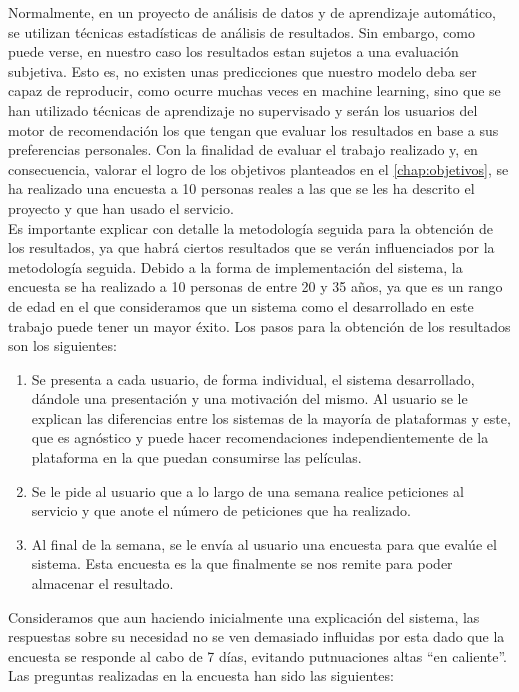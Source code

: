 Normalmente, en un proyecto de análisis de datos y de aprendizaje automático, se utilizan técnicas estadísticas de análisis de resultados. Sin embargo, como puede verse, en nuestro caso los resultados estan sujetos a una evaluación subjetiva. Esto es, no existen unas predicciones que nuestro modelo deba ser capaz de reproducir, como ocurre muchas veces en machine learning, sino que se han utilizado técnicas de aprendizaje no supervisado y serán los usuarios del motor de recomendación los que tengan que evaluar los resultados en base a sus preferencias personales. Con la finalidad de evaluar el trabajo realizado y, en consecuencia, valorar el logro de los objetivos planteados en el \autoref{chap:objetivos}, se ha realizado una encuesta a 10 personas reales a las que se les ha descrito el proyecto y que han usado el servicio.\\

Es importante explicar con detalle la metodología seguida para la obtención de los resultados, ya que habrá ciertos resultados que se verán influenciados por la metodología seguida. Debido a la forma de implementación del sistema, la encuesta se ha realizado a 10 personas de entre 20 y 35 años, ya que es un rango de edad en el que consideramos que un sistema como el desarrollado en este trabajo puede tener un mayor éxito. Los pasos para la obtención de los resultados son los siguientes:

\begin{enumerate}
    \item Se presenta a cada usuario, de forma individual, el sistema desarrollado, dándole una presentación y una motivación del mismo. Al usuario se le explican las diferencias entre los sistemas de la mayoría de plataformas y este, que es agnóstico y puede hacer recomendaciones independientemente de la plataforma en la que puedan consumirse las películas.
    \item Se le pide al usuario que a lo largo de una semana realice peticiones al servicio y que anote el número de peticiones que ha realizado.
    \item Al final de la semana, se le envía al usuario una encuesta para que evalúe el sistema. Esta encuesta es la que finalmente se nos remite para poder almacenar el resultado.
\end{enumerate}

Consideramos que aun haciendo inicialmente una explicación del sistema, las respuestas sobre su necesidad no se ven demasiado influidas por esta dado que la encuesta se responde al cabo de 7 días, evitando putnuaciones altas ``en caliente''. Las preguntas realizadas en la encuesta han sido las siguientes:

